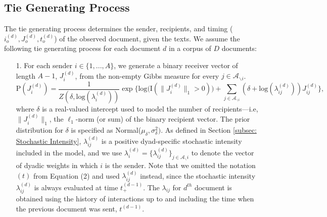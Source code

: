\subsection{Tie Generating Process}\label{subsec: Tie Generating Process} 
The tie generating process determines the sender, recipients, and timing ($i_o^{(d)}, J_o^{(d)}, t_o^{(d)}$) of the observed document, given the texts. We assume the following tie generating process for each document $d$ in a corpus of $D$ documents:
\begin{itemize} 
	\item[1.] For each sender $i \in \{1,...,A\}$, we generate a binary receiver vector of length $A-1$, $J^{(d)}_i$, from the non-empty Gibbs measure \citep{fellows2017removing} for every $j \in \mathcal{A}_{\backslash i}$. 
%
	\begin{equation} \text{P}(J_i^{(d)}) = \frac{1}{Z(\delta,\mbox{log}(\lambda_i^{(d)}))} \exp\Big\{ \mbox{log}\big(\text{I}( \lVert J_i^{(d)} \rVert_1 > 0 )\big) + \sum_{j \in \mathcal{A}_{\backslash i}} (\delta+\mbox{log}(\lambda_{ij}^{(d)}))J_{ij}^{(d)} \Big\},
		\label{alg:gibbsmeasure}
		\end{equation}
% 
	where $\delta$ is a real-valued intercept used to model the number of recipients---i.e, $\lVert J_{i}^{(d)} \rVert_1$, the $\ell_1$-norm (or sum) of the binary recipient vector. The prior distribution for $\delta$ is specified as Normal($\mu_\delta, \sigma^2_\delta)$. As defined in Section \ref{subsec: Stochastic Intensity}, $\lambda_{ij}^{(d)}$ is a positive dyad-specific stochastic intensity included in the model, and we use $\lambda_{i}^{(d)}=\{\lambda_{ij}^{(d)}\}_{j\in \mathcal{A}_\backslash i}$ to denote the vector of dyadic weights in which $i$ is the sender. Note that we omitted the notation $(t)$ from Equation (2) and used $\lambda_{ij}^{(d)}$ instead, since the stochastic intensity $\lambda_{ij}^{(d)}$ is always evaluated at time $t_+^{(d-1)}$. The $\lambda_{ij}$ for $d^{th}$ document is obtained using the history of interactions up to and including the time when the previous document was sent, $t^{(d-1)}$. 
	

\end{itemize}
